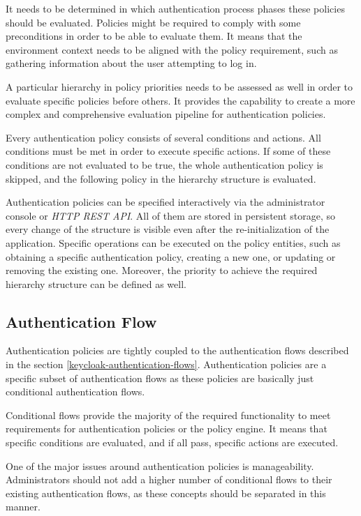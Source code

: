 It needs to be determined in which authentication process phases these policies should be evaluated.
Policies might be required to comply with some preconditions in order to be able to evaluate them.
It means that the environment context needs to be aligned with the policy requirement, such as gathering information about the user attempting to log in.

A particular hierarchy in policy priorities needs to be assessed as well in order to evaluate specific policies before others.
It provides the capability to create a more complex and comprehensive evaluation pipeline for authentication policies.

Every authentication policy consists of several conditions and actions.
All conditions must be met in order to execute specific actions.
If some of these conditions are not evaluated to be true, the whole authentication policy is skipped, and the following policy in the hierarchy structure is evaluated.

Authentication policies can be specified interactively via the administrator console or \textit{HTTP REST API}.
All of them are stored in persistent storage, so every change of the structure is visible even after the re-initialization of the application. 
Specific operations can be executed on the policy entities, such as obtaining a specific authentication policy, creating a new one, or updating or removing the existing one.
Moreover, the priority to achieve the required hierarchy structure can be defined as well.

\newpage

\subsection{Authentication Flow}

Authentication policies are tightly coupled to the authentication flows described in the section \ref{keycloak-authentication-flows}.
Authentication policies are a specific subset of authentication flows as these policies are basically just conditional authentication flows.

Conditional flows provide the majority of the required functionality to meet requirements for authentication policies or the policy engine.
It means that specific conditions are evaluated, and if all pass, specific actions are executed.

One of the major issues around authentication policies is manageability.
Administrators should not add a higher number of conditional flows to their existing authentication flows, as these concepts should be separated in this manner.

